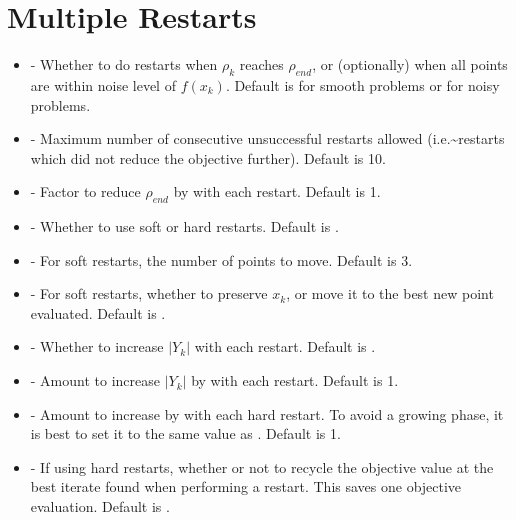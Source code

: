 \documentclass[letterpaper,10pt,english]{sphinxmanual}
\begin{document}
\section{Multiple Restarts}
\label{\detokenize{advanced:multiple-restarts}}\begin{itemize}
\item {} 
 - Whether to do restarts when \(\rho_k\) reaches \(\rho_{end}\), or (optionally) when all points are within noise level of \(f(x_k)\). Default is  for smooth problems or  for noisy problems.

\item {} 
 - Maximum number of consecutive unsuccessful restarts allowed (i.e.\textasciitilde{}restarts which did not reduce the objective further). Default is 10.

\item {} 
 - Factor to reduce \(\rho_{end}\) by with each restart. Default is 1.

\item {} 
 - Whether to use soft or hard restarts. Default is .

\item {} 
 - For soft restarts, the number of points to move. Default is 3.

\item {} 
 - For soft restarts, whether to preserve \(x_k\), or move it to the best new point evaluated. Default is .

\item {} 
 - Whether to increase \(|Y_k|\) with each restart. Default is .

\item {} 
 - Amount to increase \(|Y_k|\) by with each restart. Default is 1.

\item {} 
 - Amount to increase  by with each hard restart. To avoid a growing phase, it is best to set it to the same value as . Default is 1.

\item {} 
 - If using hard restarts, whether or not to recycle the objective value at the best iterate found when performing a restart. This saves one objective evaluation. Default is .


\end{itemize}
\end{document}
